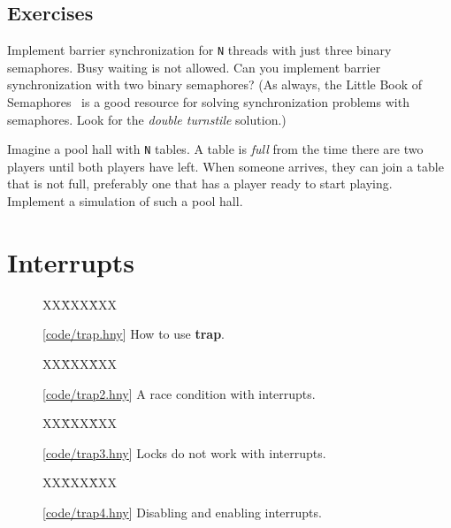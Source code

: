 \documentclass{report}
\newcommand{\harmonysource}[1]{
\begin{tabbing}
XX\=XXX\=XXX\kill
    
\end{tabbing}
}
\newcommand{\harmonylink}[1]{%
[\href{https://harmony.cs.cornell.edu/#1}{\underline{#1}}]%
}
\newenvironment{code}{
\tcolorbox
}{
\endtcolorbox
}
\begin{document}
\section*{Exercises}
\begin{problems}
\item Implement barrier synchronization for \texttt{N} threads
with just three binary semaphores.  Busy waiting is not allowed.
Can you implement barrier synchronization with two binary semaphores?
(As always, the Little Book of Semaphores~\cite{Downey09} is a good resource
for solving synchronization problems with semaphores.
Look for the \emph{double turnstile}
%
solution.)
\item Imagine a pool hall with \texttt{N} tables.  A table is \emph{full}
from the time there are two players until both players have left.
When someone arrives, they can join a table that is not full, preferably
one that has a player ready to start playing.
Implement a simulation of such a pool hall.
\end{problems}

\chapter{Interrupts}
\label{ch:interrupts}

\begin{figure}
\begin{code}
\harmonysource{trap}
\end{code}
\caption{\harmonylink{code/trap.hny} How to use \textbf{trap}.}
\label{fig:trap}
\end{figure}

\begin{figure}
\begin{code}
\harmonysource{trap2}
\end{code}
\caption{\harmonylink{code/trap2.hny} A race condition with interrupts.}
\label{fig:trap2}
\end{figure}

\begin{figure}
\begin{code}
\harmonysource{trap3}
\end{code}
\caption{\harmonylink{code/trap3.hny} Locks do not work with interrupts.}
\label{fig:trap3}
\end{figure}

\begin{figure}
\begin{code}
\harmonysource{trap4}
\end{code}
\caption{\harmonylink{code/trap4.hny} Disabling and enabling interrupts.}
\label{fig:trap4}
\end{figure}
\end{document}
